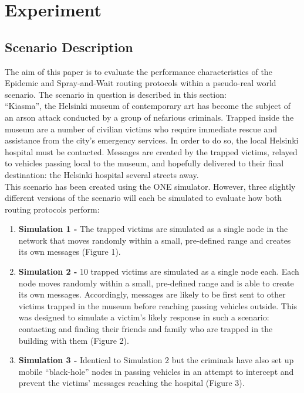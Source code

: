 \documentclass{article}
\begin{document}
\section{Experiment}
\subsection{Scenario Description}
The aim of this paper is to evaluate the performance characteristics of the Epidemic and Spray-and-Wait routing protocols within a pseudo-real world scenario. The scenario in question is described in this section:\\

\newline ``Kiasma'', the Helsinki museum of contemporary art has become the subject of an arson attack conducted by a group of nefarious criminals. Trapped inside the museum are a number of civilian victims who require immediate rescue and assistance from the city's emergency services. In order to do so, the local Helsinki hospital must be contacted. Messages are created by the trapped victims, relayed to vehicles passing local to the museum, and hopefully delivered to their final destination: the Helsinki hospital several streets away.\\

\newline This scenario has been created using the ONE simulator. However, three slightly different versions of the scenario will each be simulated to evaluate how both routing protocols perform:

\begin{enumerate}
	\item \textbf{Simulation 1 - }The trapped victims are simulated as a single node in the network that moves randomly within a small, pre-defined range and creates its own messages (Figure 1).
	\item \textbf{Simulation 2 - }10 trapped victims are simulated as a single node each. Each node moves randomly within a small, pre-defined range and is able to create its own messages. Accordingly, messages are likely to be first sent to other victims trapped in the museum before reaching passing vehicles outside. This was designed to simulate a victim's likely response in such a scenario: contacting and finding their friends and family who are trapped in the building with them (Figure 2).
	\item \textbf{Simulation 3 - }Identical to Simulation 2 but the criminals have also set up mobile ``black-hole'' nodes in passing vehicles in an attempt to intercept and prevent the victims' messages reaching the hospital (Figure 3).
\end{enumerate}
\end{document}
